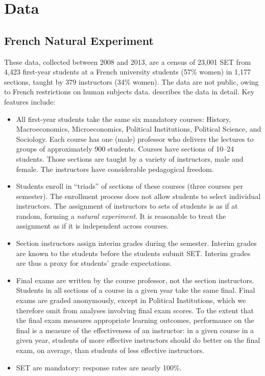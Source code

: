 \documentclass[12pt]{article}
\begin{document}
\section{Data}
\subsection{French Natural Experiment}
These data, collected between 2008 and 2013, are a census of 23,001 SET from
4,423 first-year students at a French university students (57\% women) in 1,177
sections, taught by 379 instructors (34\% women). 
The data are not public, owing to French restrictions on human subjects data.
\citet{Boring2015} describes the data in detail.
Key features include:
\begin{itemize}
   \item All first-year students take the same six mandatory courses: 
            History, Macroeconomics, Microeconomics, 
            Political Institutions, Political Science, and Sociology.
            Each course has one (male) professor
            who delivers the lectures to groups of approximately 900 students. 
            Courses have sections of 10--24 students. 
            Those sections are taught by a variety of instructors, male and female.
            The instructors have considerable pedagogical freedom.
    
   \item Students enroll in ``triads'' of sections of these courses (three courses per semester). 
            The enrollment process does not allow students to select individual instructors.
            The assignment of instructors to sets of students is as if at random,
            forming a \emph{natural experiment}.
            It is reasonable to treat the assignment as if it is independent across 
            courses.
            
   \item Section instructors assign interim grades during the semester.
            Interim grades are known to the students before the students submit SET.
            Interim grades are thus a proxy for students' grade expectations.
            
   \item Final exams are written by the course professor, not the section instructors.
            Students in all sections of a course in a given year take the same final.
            Final exams are graded anonymously, except in Political
            Institutions, which we therefore omit from analyses involving final exam scores.
            To the extent that the final exam measures appropriate learning outcomes, 
            performance on the final is a measure of the effectiveness of
            an instructor: in a given course in a given year,
            students of more effective instructors should do better on
            the final exam, on average, than students of less effective instructors.
    
   \item SET are mandatory: response rates are nearly 100\%.
   
\end{itemize}
\end{document}
